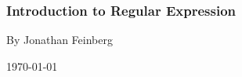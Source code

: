 \documentclass{beamer}
\begin{document}
\begin{frame}
  \frametitle{Introduction to Regular Expression}

  By Jonathan Feinberg

  \today
\end{frame}


\end{document}
